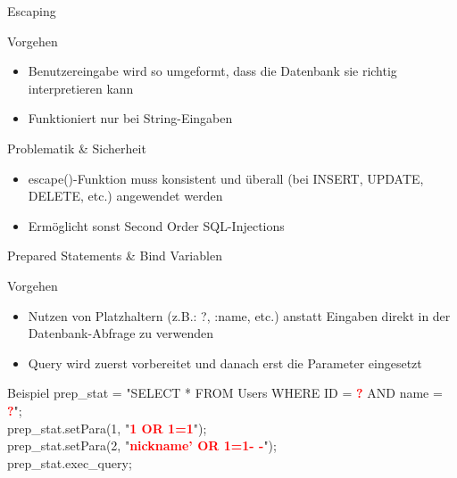 \begin{frame}{Escaping}
\begin{block}{Vorgehen}
\begin{itemize}
\item Benutzereingabe wird so umgeformt, dass die Datenbank sie richtig interpretieren kann
\item Funktioniert nur bei String-Eingaben
\end{itemize}
\end{block}
\begin{block}{Problematik \& Sicherheit}
\begin{itemize}[<+->]
\item escape()-Funktion muss konsistent und überall (bei INSERT, UPDATE, DELETE, etc.) angewendet werden
\item Ermöglicht sonst Second Order SQL-Injections
\end{itemize}
\end{block}
\end{frame}

\begin{frame}{Prepared Statements \& Bind Variablen}
\begin{block}{Vorgehen}
\begin{itemize}[<+->]
\item Nutzen von Platzhaltern (z.B.: ?, :name, etc.) anstatt Eingaben direkt in der Datenbank-Abfrage zu verwenden
\item Query wird zuerst vorbereitet und danach erst die Parameter eingesetzt
\end{itemize}
\end{block}
\begin{block}{Beispiel}
prep\_stat = "{}SELECT * FROM Users WHERE ID = \textcolor{red}{\textbf{?}} AND name = \textcolor{red}{\textbf{?}}"{}; \\
prep\_stat.setPara(1, "{}\textcolor{red}{\textbf{1 OR 1=1}}{}"); \\
prep\_stat.setPara(2, "{}\textcolor{red}{\textbf{nickname'{} OR 1=1- -}}{}"); \\
prep\_stat.exec\_query;
\end{block}
\end{frame}

